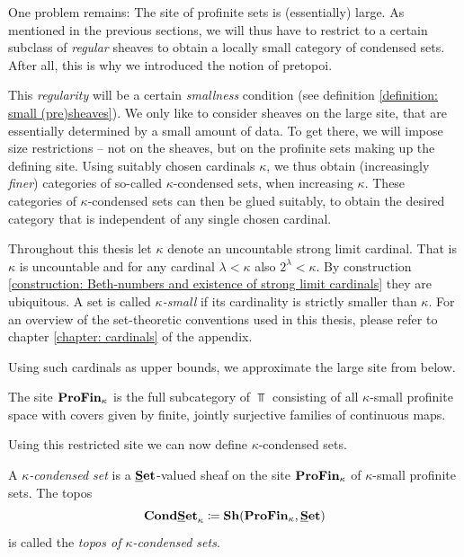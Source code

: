 One problem remains: The site of profinite sets is (essentially) large. As mentioned in the previous sections, we will thus have to restrict to a certain subclass of \emph{regular} sheaves to obtain a locally small category of condensed sets. After all, this is why we introduced the notion of pretopoi.

This \emph{regularity} will be a certain \emph{smallness} condition (see definition \ref{definition: small (pre)sheaves}). We only like to consider sheaves on the large site, that are essentially determined by a small amount of data. To get there, we will impose size restrictions -- not on the sheaves, but on the profinite sets making up the defining site. Using suitably chosen cardinals $\kappa$, we thus obtain (increasingly \emph{finer}) categories of so-called $\kappa$-condensed sets, when increasing $\kappa$. These categories of $\kappa$-condensed sets can then be glued suitably, to obtain the desired category that is independent of any single chosen cardinal.
\begin{convention}
	Throughout this thesis let $\kappa$ denote an uncountable strong limit cardinal. That is $\kappa$ is uncountable and for any cardinal $\lambda < \kappa$ also $2^\lambda < \kappa$. By construction \ref{construction: Beth-numbers and existence of strong limit cardinals} they are ubiquitous. A set is called \emph{$\kappa$-small} if its cardinality is strictly smaller than $\kappa$. For an overview of the set-theoretic conventions used in this thesis, please refer to chapter \ref{chapter: cardinals} of the appendix.
\end{convention}

Using such cardinals as upper bounds, we approximate the large site from below.
\begin{definition}
	The site ${\mathbf{ProFin}}_{\kappa}$ is the full subcategory of $\Top$ consisting of all $\kappa$-small profinite space with covers given by finite, jointly surjective families of continuous maps.
\end{definition}

Using this restricted site we can now define $\kappa$-condensed sets.
\begin{definition}
	\label{definition: the topos of kappa-condensed sets}
	
	A \emph{$\kappa$-condensed set} is a ${{\mathbf{\underline{S}et}}}$-valued sheaf on the site ${\mathbf{ProFin}}_{\kappa}$ of $\kappa$-small profinite sets. The topos
		$$\boundedCondensedSets{\kappa}\ldef \Sheaves {\boundedProFiniteSets\kappa}{\Set}$$
	is called the \emph{topos of $\kappa$-condensed sets}.
\end{definition}

